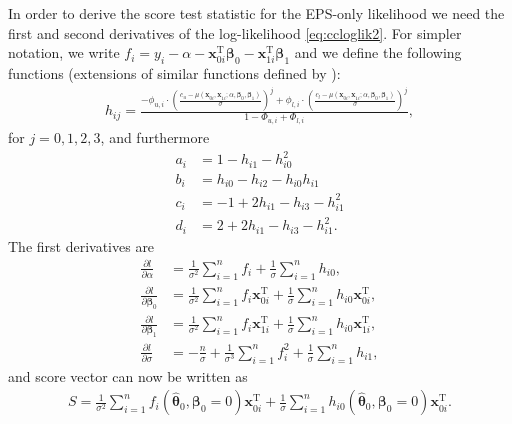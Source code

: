 \documentclass[10pt,a4paper]{article}
\def\bbeta{\bm{\beta}}
\def\bxoi{\mathbf{x}_{0i}}
\def\bxni{\mathbf{x}_{1i}}
\begin{document}
In order to derive the score test statistic for the EPS-only likelihood we need the first and second derivatives of the log-likelihood \eqref{eq:ccloglik2}. For simpler notation, we write $f_i = y_i - \alpha - \bxoi^{\text{T}} \bbeta_0 - \bxni^{\text{T}} \bbeta_1$ and we define the following functions (extensions of similar functions defined by \cite{tang2010equivalence}):
\begin{align*}
h_{ij} = \frac{-\phi_{u,i}\cdot\left( \frac{c_u - \mu(\bxoi, \bxni; \alpha, \bbeta_0, \bbeta_1)}{\sigma} \right)^j +\phi_{l,i}\cdot\left( \frac{c_l - \mu(\bxoi, \bxni; \alpha, \bbeta_0, \bbeta_1)}{\sigma} \right)^j}{1-\Phi_{u,i}+\Phi_{l,i}},
\label{def:h}
\end{align*}
for $j = 0,1,2,3$, and furthermore
\begin{align*}
a_i & = 1 - h_{i1} - h_{i0}^2 \\
b_i & = h_{i0} - h_{i2} - h_{i0}h_{i1} \\
c_i & = - 1 + 2h_{i1} - h_{i3} - h_{i1}^2 \\
d_i & = 2 + 2h_{i1} - h_{i3} - h_{i1}^2.
\end{align*}
The first derivatives are
\begin{align*}
\frac{\partial l}{\partial \alpha} 
&= \frac{1}{\sigma^2}\sum_{i=1}^n f_i + \frac{1}{\sigma}\sum_{i=1}^n h_{i0}, \\
\frac{\partial l}{\partial \bbeta_0} 
&= \frac{1}{\sigma^2}\sum_{i=1}^n f_i \bxoi^{\text{T}} + \frac{1}{\sigma}\sum_{i=1}^n h_{i0}\bxoi^{\text{T}}, \\
\frac{\partial l}{\partial \bbeta_1} 
&= \frac{1}{\sigma^2}\sum_{i=1}^n f_i \bxni^{\text{T}} + \frac{1}{\sigma}\sum_{i=1}^n h_{i0}\bxni^{\text{T}}, \\
\frac{\partial l}{\partial \sigma} 
&= -\frac{n}{\sigma} + \frac{1}{\sigma^3}\sum_{i=1}^nf_i^2 + \frac{1}{\sigma}\sum_{i=1}^n h_{i1},
\end{align*}
and score vector can now be written as
\begin{align*}
S = \frac{1}{\sigma^2}\sum_{i=1}^n f_i (\hat{\boldsymbol\theta}_0, \bbeta_0 = 0) \bxoi^{\text{T}} + \frac{1}{\sigma}\sum_{i=1}^n h_{i0} (\hat{\boldsymbol\theta}_0, \bbeta_0 = 0)\bxoi^{\text{T}}.
\end{align*}
\end{document}
